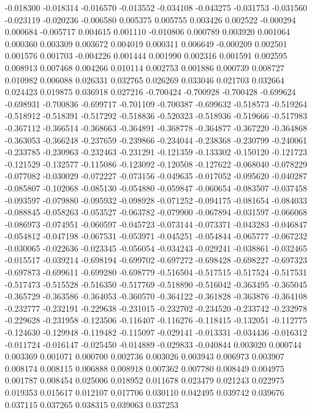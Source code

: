 -0.018300
-0.018314
-0.016570
-0.013552
-0.034108
-0.043275
-0.031753
-0.031560
-0.023119
-0.020236
-0.006580
0.005375
0.005755
0.003426
0.002522
-0.000294
0.000684
-0.005717
0.004615
0.001110
-0.010806
0.000789
0.003920
0.001064
0.000360
0.003309
0.003672
0.004019
0.000311
0.006649
-0.000209
0.002501
0.001576
0.001703
-0.004226
0.001444
0.001990
0.002316
0.001591
0.002595
0.008913
0.007468
0.004266
0.010114
0.002753
0.001886
0.000739
0.008727
0.010982
0.006088
0.026331
0.032765
0.026269
0.033046
0.021703
0.032664
0.024423
0.019875
0.036918
0.027216
-0.700424
-0.700928
-0.700428
-0.699624
-0.698931
-0.700836
-0.699717
-0.701109
-0.700387
-0.699632
-0.518573
-0.519264
-0.518912
-0.518391
-0.517292
-0.518836
-0.520323
-0.518936
-0.519666
-0.517983
-0.367112
-0.366514
-0.368663
-0.364891
-0.368778
-0.364877
-0.367220
-0.364868
-0.363053
-0.366248
-0.237659
-0.239866
-0.234044
-0.238368
-0.230799
-0.240061
-0.233785
-0.230963
-0.232463
-0.231291
-0.121359
-0.133302
-0.150120
-0.121723
-0.121529
-0.132577
-0.115086
-0.123092
-0.120508
-0.127622
-0.068040
-0.078229
-0.077082
-0.030029
-0.072227
-0.073156
-0.049635
-0.017052
-0.095620
-0.040287
-0.085807
-0.102068
-0.085130
-0.054880
-0.059847
-0.060654
-0.083507
-0.037458
-0.093597
-0.079880
-0.095932
-0.098928
-0.071252
-0.094175
-0.081654
-0.084033
-0.088845
-0.058263
-0.053527
-0.063782
-0.079900
-0.067894
-0.031597
-0.066068
-0.086973
-0.074951
-0.060597
-0.045723
-0.073144
-0.073371
-0.043283
-0.046847
-0.054812
-0.047198
-0.067531
-0.053971
-0.045251
-0.054844
-0.065777
-0.067232
-0.030065
-0.022636
-0.023345
-0.056054
-0.034243
-0.029241
-0.038861
-0.032465
-0.015517
-0.039214
-0.698194
-0.699702
-0.697272
-0.698428
-0.698227
-0.697323
-0.697873
-0.699611
-0.699280
-0.698779
-0.516504
-0.517515
-0.517524
-0.517531
-0.517473
-0.515528
-0.516350
-0.517769
-0.518890
-0.516042
-0.363495
-0.365045
-0.365729
-0.363586
-0.364053
-0.360570
-0.364122
-0.361828
-0.363876
-0.364108
-0.232777
-0.232191
-0.229638
-0.231015
-0.232702
-0.234520
-0.233742
-0.232978
-0.229628
-0.231958
-0.123506
-0.116407
-0.116276
-0.118415
-0.132051
-0.112775
-0.124630
-0.129948
-0.119482
-0.115097
-0.029141
-0.013331
-0.034436
-0.016312
-0.011724
-0.016147
-0.025450
-0.014889
-0.029833
-0.040844
0.003020
0.000744
0.003369
0.001071
0.000700
0.002736
0.003026
0.003943
0.006973
0.003907
0.008174
0.008115
0.006888
0.008918
0.007362
0.007780
0.008449
0.004975
0.001787
0.008454
0.025006
0.018952
0.011678
0.023479
0.021243
0.022975
0.019353
0.015617
0.012107
0.017706
0.030110
0.042495
0.039742
0.039676
0.037115
0.037265
0.038315
0.039063
0.037253
